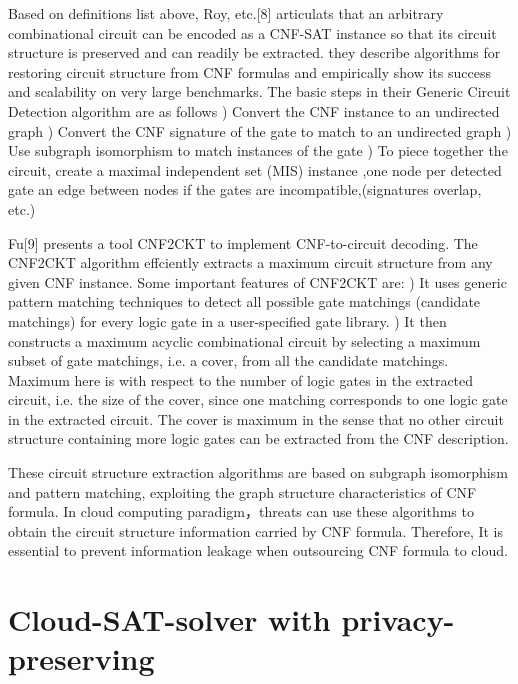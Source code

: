 \documentclass[runningheads,a4paper]{llncs}
\begin{document}
Based on definitions list above, Roy, etc.[8] articulats that an arbitrary combinational circuit can be encoded as a CNF-SAT instance so that its circuit structure is preserved and can readily be extracted. they describe algorithms for restoring circuit structure from CNF formulas and empirically show its success and scalability on very large benchmarks. The basic steps in their Generic Circuit Detection algorithm are as follows 
)	Convert the CNF instance to an undirected graph
)	Convert the CNF signature of the gate to match to an undirected graph
)	Use subgraph isomorphism to match instances of the gate
)	To piece together the circuit, create a maximal independent set (MIS) instance ,one node per detected gate an edge between nodes if the gates are incompatible,(signatures overlap, etc.)

Fu[9] presents a tool CNF2CKT to implement CNF-to-circuit decoding. The CNF2CKT algorithm effciently extracts a maximum circuit structure from any given CNF instance. Some important features of CNF2CKT are:
) It uses generic pattern matching techniques to detect all possible gate matchings (candidate matchings) for every logic gate in a user-specified gate library.
) It then constructs a maximum acyclic combinational circuit by selecting a maximum subset of gate matchings, i.e. a cover, from all the candidate matchings. Maximum here is with respect to the number of logic gates in the extracted circuit, i.e. the size of the cover, since one matching corresponds to one logic gate in the extracted circuit. The cover is maximum in the sense that no other circuit structure containing more logic gates can be extracted from the CNF description.

These circuit structure extraction algorithms are based on subgraph isomorphism and pattern matching, exploiting the graph structure characteristics of CNF formula. In cloud computing paradigm，threats can use these algorithms to obtain the circuit structure information carried by CNF formula. Therefore, It is essential to prevent information leakage when outsourcing CNF formula to cloud.

\section{Cloud-SAT-solver with privacy-preserving}
\end{document}
